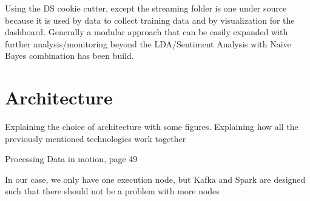 

Using the DS cookie cutter, except the streaming folder is one under source because it is used by data to collect training data and by visualization for the dashboard.
Generally a modular approach that can be easily expanded with further analysis/monitoring beyond the LDA/Sentiment Analysis with Naive Bayes combination has been build.


\section{Architecture}
\label{sec:architecture}

Explaining the choice of architecture with some figures.
Explaining how all the previously mentioned technologies work together

Processing Data in motion, page 49

In our case, we only have one execution node, but Kafka and Spark are designed such that there should not be a problem with more nodes

